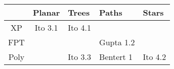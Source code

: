 
\renewcommand{\arraystretch}{1.5}
\begin{tabularx}{\textwidth}{|c||c|Y|Y|Y|}
	\hline

	&
	Planar&
	Trees &
	Paths &
	Stars \\

	\hline
	\hline

	XP &
	 Ito 3.1 &
	 Ito 4.1 &
	 &
	 \\

	\hline

	FPT &
	 &
	 &
	 Gupta 1.2 &
	 \\

	\hline

	Poly &
	 &
	 Ito 3.3 &
	 Bentert 1 &
	 Ito 4.2 \\

	\hline
\end{tabularx}
\renewcommand{\arraystretch}{1}
